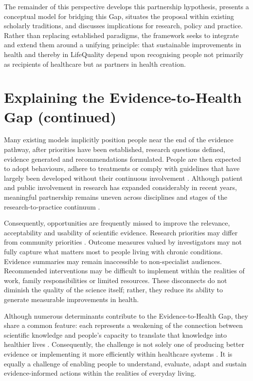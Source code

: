 \documentclass{article}
\begin{document}
The remainder of this perspective develops this partnership hypothesis, presents a conceptual model for bridging this Gap, situates the proposal within existing scholarly traditions, and discusses implications for research, policy and practice. Rather than replacing established paradigms, the framework seeks to integrate and extend them around a unifying principle: that sustainable improvements in health and thereby in LifeQuality depend upon recognising people not primarily as recipients of healthcare but as partners in health creation.
\section{Explaining the Evidence-to-Health Gap (continued)}
\label{sec:orgcd2918d}

Many existing models implicitly position people near the end of the evidence pathway, after priorities have been established, research questions defined, evidence generated and recommendations formulated. People are then expected to adopt behaviours, adhere to treatments or comply with guidelines that have largely been developed without their continuous involvement \cite{Elwyn2012} \cite{WHOIPCHS2016}. Although patient and public involvement in research has expanded considerably in recent years, meaningful partnership remains uneven across disciplines and stages of the research-to-practice continuum \cite{Greenhalgh2016} \cite{PCORI2018} \cite{INVOLVE2012} \cite{WHOIPCHS2016}.

Consequently, opportunities are frequently missed to improve the relevance, acceptability and usability of scientific evidence. Research priorities may differ from community priorities \cite{Marmot2012}. Outcome measures valued by investigators \cite{Elwyn2012} may not fully capture what matters most to people living with chronic conditions. Evidence summaries may remain inaccessible \cite{Nutbeam2000} \cite{Greenhalgh2011} to non-specialist audiences. Recommended interventions may be difficult to implement \cite{Michie2011} \cite{Nilsen2015} within the realities of work, family responsibilities or limited resources. These disconnects do not diminish the quality of the science itself; rather, they reduce its ability to generate measurable improvements in health.

Although numerous determinants contribute to the Evidence-to-Health Gap, they share a common feature: each represents a weakening of the connection between scientific knowledge and people's capacity to translate that knowledge into healthier lives \cite{Bandura2004} \cite{Michie2011}. Consequently, the challenge is not solely one of producing better evidence or implementing it more efficiently within healthcare systems \cite{Eccles2006} \cite{Straus2013}. It is equally a challenge of enabling people to understand, evaluate, adapt and sustain evidence-informed actions within the realities of everyday living.
\end{document}
